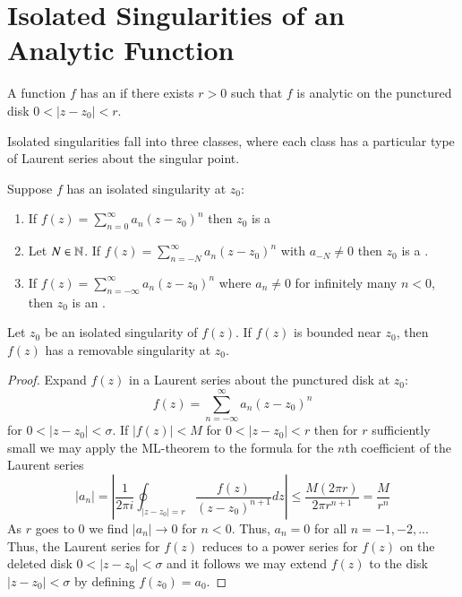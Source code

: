 \documentclass[12pt, a4paper, oneside, openright, titlepage]{book}
\begin{document}
\section{Isolated Singularities of an Analytic Function}


\begin{defn}
    A function $f$ has an  if there exists $r > 0$ such that $f$ is analytic on the punctured disk $0 < |z-z_0| < r$.
\end{defn}


Isolated singularities fall into three classes, where each class has a particular type of Laurent series about the singular point.

\begin{defn}
    Suppose $f$ has an isolated singularity at $z_0$: \begin{enumerate}
        \item If $f(z) = \sum_{n=0}^{\infty}a_n(z-z_0)^n$ then $z_0$ is a 
        \item Let $N \in \mathbb N$. If $f(z) = \sum_{n=-N}^{\infty}a_n(z-z_0)^n$ with $a_{-N} \neq 0$ then $z_0$ is a .
        \item If $f(z) = \sum_{n=-\infty}^{\infty}a_n(z-z_0)^n$ where $a_n \neq 0$ for infinitely many $n < 0$, then $z_0$ is an .
    \end{enumerate}
\end{defn}


\begin{thm}
    Let $z_0$ be an isolated singularity of $f(z)$. If $f(z)$ is bounded near $z_0$, then $f(z)$ has a removable singularity at $z_0$.
\end{thm}
\begin{proof}
    Expand $f(z)$ in a Laurent series about the punctured disk at $z_0$: \begin{equation*}
        f(z) = \sum_{n=-\infty}^{\infty}a_n(z-z_0)^n
    \end{equation*}
    for $0 < |z-z_0| < \sigma$. If $|f(z)| < M$ for $0 < |z-z_0| < r$ then for $r$ sufficiently small we may apply the ML-theorem to the formula for the $n$th coefficient of the Laurent series \begin{equation*}
        |a_n| = \left|\frac{1}{2\pi i}\oint_{|z-z_0|=r}\frac{f(z)}{(z-z_0)^{n+1}}dz\right| \leq \frac{M(2\pi r)}{2\pi r^{n+1}} = \frac{M}{r^n}
    \end{equation*}
    As $r$ goes to $0$ we find $|a_n|\rightarrow 0$ for $n < 0$. Thus, $a_n = 0$ for all $n  = -1,-2,...$ Thus, the Laurent series for $f(z)$ reduces to a power series for $f(z)$ on the deleted disk $0 < |z-z_0| < \sigma$ and it follows we may extend $f(z)$ to the disk $|z-z_0| < \sigma$ by defining $f(z_0) = a_0$.
\end{proof}
\end{document}
